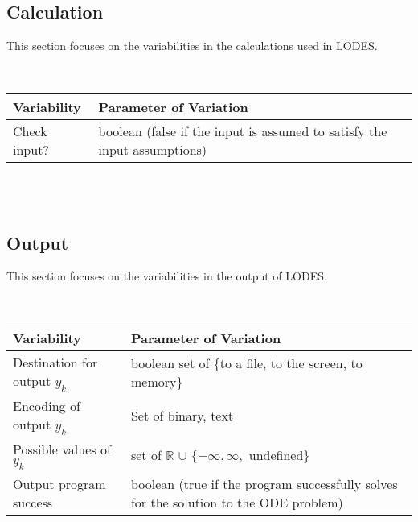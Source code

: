 \documentclass[12pt]{article}
\newcommand{\progname}{LODES} %
\begin{document}
~\newline

\subsection{Calculation} \label{Sec_calc}

This section focuses on the variabilities in the calculations used in \progname{}.

~\newline

\noindent
\begin{minipage}{\textwidth}
\renewcommand*{\arraystretch}{1.5}
\begin{tabular}{|p{}| p{}|}
  \hline
  \rowcolor[gray]{0.9}
  Variability& Parameter of Variation\\
  \hline
  Check input? & boolean (false if the input is assumed to satisfy the input assumptions)\\

  \hline
\end{tabular}
\end{minipage}\\

~\newline

\subsection{Output} \label{Sec_calc}

This section focuses on the variabilities in the output of \progname{}.

~\newline

\noindent
\begin{minipage}{\textwidth}
\renewcommand*{\arraystretch}{1.5}
\begin{tabular}{|p{}| p{}|}
  \hline
  \rowcolor[gray]{0.9}
  Variability& Parameter of Variation\\
  \hline
  Destination for output $y_k$ & boolean set of \{to a file, to the screen, to memory\}\\
  \hline
  Encoding of output $y_k$& Set of {binary, text} \\
  \hline
  Possible values of $y_k$ & set of $\mathbb{R}$ $\cup$ $\{-\infty, \infty,$ undefined$\}$ \\ 
  \hline
  Output program success & boolean (true if the program successfully
  solves for the solution to the ODE problem)\\
  \hline
\end{tabular}
\end{minipage}\\
\end{document}
